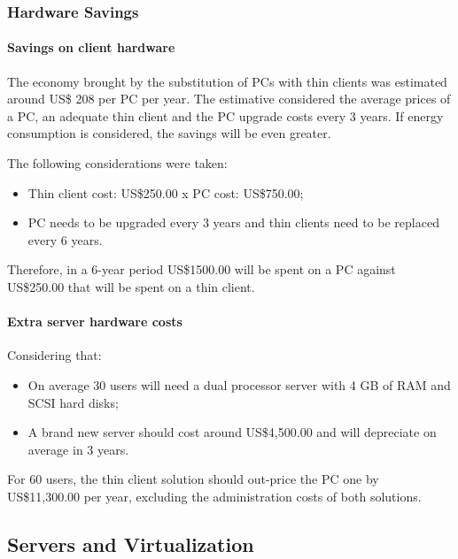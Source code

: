 {            \subsubsection*{Hardware Savings}
                \paragraph*{Savings on client hardware} 
                    The economy brought by the substitution of PCs with thin clients was estimated around US\$ 208 per PC per year. The estimative considered the average prices of a PC, an adequate thin client and the PC upgrade costs every 3 years. If energy consumption is considered, the savings will be even greater.

                The following considerations were taken:
                \begin{itemize}
                    \item Thin client cost: US\$250.00 x PC cost: US\$750.00;
                    \item PC needs to be upgraded every 3 years and thin clients need to be replaced every 6 years.
                \end{itemize}
                Therefore, in a 6-year period US\$1500.00 will be spent on a PC against US\$250.00 that will be spent on a thin client.

            \paragraph*{Extra server hardware costs}
                Considering that:
                \begin{itemize}
                    \item On average 30 users will need a dual processor server with 4 GB of RAM and SCSI hard disks;
                    \item A brand new server should cost around US\$4,500.00 and will depreciate on average in 3 years.
                \end{itemize}
                For 60 users, the thin client solution should out-price the PC one by US\$11,300.00 per year, excluding the administration costs of both solutions.

        \subsection{Servers and Virtualization} \label{sec2:servers_virtualization}
                        
}
